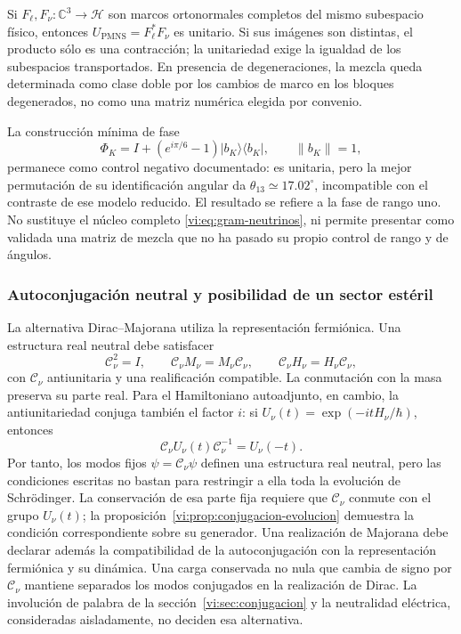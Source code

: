 Si \(F_\ell,F_\nu:\mathbb C^3\to\mathcal H\) son marcos ortonormales
completos del mismo subespacio físico, entonces
\(U_{\mathrm{PMNS}}=F_\ell^*F_\nu\) es unitario. Si sus imágenes son
distintas, el producto sólo es una contracción; la unitariedad exige la
igualdad de los subespacios transportados. En presencia de degeneraciones,
la mezcla queda determinada como clase doble por los cambios de marco en
los bloques degenerados, no como una matriz numérica elegida por convenio.

La construcción mínima de fase
\[
 \Phi_K=I+(e^{i\pi/6}-1)|b_K\rangle\langle b_K|,
 \qquad\|b_K\|=1,
\]
permanece como control negativo documentado: es unitaria, pero la mejor
permutación de su identificación angular da
\(\theta_{13}\simeq17.02^\circ\), incompatible con el contraste de ese
modelo reducido. El resultado se refiere a la fase de rango uno. No
sustituye el núcleo completo \eqref{vi:eq:gram-neutrinos}, ni permite
presentar como validada una matriz de mezcla que no ha pasado su propio
control de rango y de ángulos.

\subsubsection{Autoconjugación neutral y posibilidad de un sector estéril}

La alternativa Dirac--Majorana utiliza la representación fermiónica. Una
estructura real neutral debe satisfacer
\[
 \mathcal C_\nu^2=I,\qquad
 \mathcal C_\nu M_\nu=M_\nu\mathcal C_\nu,\qquad
 \mathcal C_\nu H_\nu=H_\nu\mathcal C_\nu,
\]
con \(\mathcal C_\nu\) antiunitaria y una realificación compatible.
La conmutación con la masa preserva su parte real. Para el Hamiltoniano
autoadjunto, en cambio, la antiunitariedad conjuga también el factor
\(i\): si \(U_\nu(t)=\exp(-itH_\nu/\hbar)\), entonces
\[
 \mathcal C_\nu U_\nu(t)\mathcal C_\nu^{-1}=U_\nu(-t).
\]
Por tanto, los modos fijos \(\psi=\mathcal C_\nu\psi\) definen una
estructura real neutral, pero las condiciones escritas no bastan para
restringir a ella toda la evolución de Schr\"odinger. La conservación de
esa parte fija requiere que \(\mathcal C_\nu\) conmute con el grupo
\(U_\nu(t)\); la proposición~\ref{vi:prop:conjugacion-evolucion}
demuestra la condición correspondiente sobre su generador. Una
realización de Majorana debe declarar además la compatibilidad de la
autoconjugación con la representación fermiónica y su dinámica.
Una carga conservada no nula que cambia
de signo por \(\mathcal C_\nu\) mantiene separados los modos conjugados
en la realización de Dirac. La involución de palabra de la
sección~\ref{vi:sec:conjugacion} y la neutralidad eléctrica, consideradas
aisladamente, no deciden esa alternativa.

